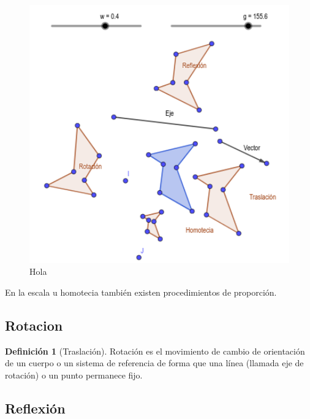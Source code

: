 \documentclass[16pt,]{krantz}
\theoremstyle{definition}
\newtheorem{definition}{Definición}[chapter]
\theoremstyle{definition}
\theoremstyle{definition}
\theoremstyle{definition}
\theoremstyle{remark}
\begin{document}
\begin{figure}

{\centering \includegraphics[width=5.44in]{trasformacion} 

}

\caption{Hola}\label{fig:Dogewwwwww}
\end{figure}

En la escala u homotecia también existen procedimientos de proporción.

\hypertarget{rotacion}{%
\subsection{Rotacion}\label{rotacion}}

\begin{definition}[Traslación]
\protect\hypertarget{def:rotacion}{}{\label{def:rotacion} {} }Rotación es el movimiento de cambio de orientación de un cuerpo o un sistema de referencia de forma que una línea (llamada eje de rotación) o un punto permanece fijo.
\end{definition}

\hypertarget{reflexiuxf3n}{%
\subsection{Reflexión}\label{reflexiuxf3n}}
\end{document}

